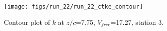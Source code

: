 \begin{figure}[H]
\centering
\texttt{[image: figs/run\_22/run\_22\_ctke\_contour]}
\caption{Contour plot of $k$ at $z/c$=7.75, $V_{free}$=17.27, station 3.}
\label{fig:run_22_ctke_contour}
\end{figure}


